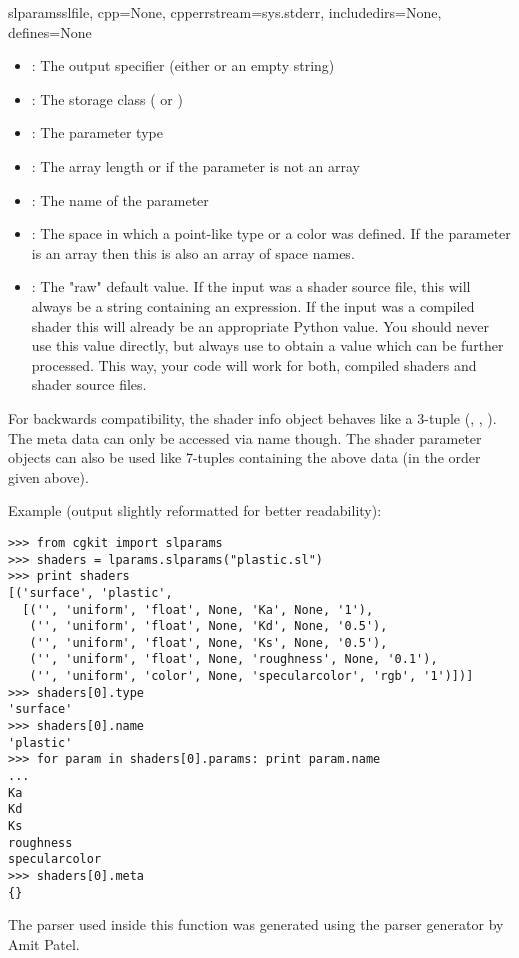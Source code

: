 \begin{funcdesc}{slparams}{slfile, cpp=None, cpperrstream=sys.stderr, includedirs=None, defines=None}
\begin{itemize}
\item {}: The output specifier (either  or an empty
string)
\item {}: The storage class ( or ) 
\item {}: The parameter type 
\item {}: The array length or  if the parameter is not
an array
\item {}: The name of the parameter 
\item {}: The space in which a point-like type or a color was
defined. If the parameter is an array then this is also an array of space names.
\item {}: The "raw" default value. If the input was a shader source file,
  this will always be a string containing an expression. If the input was
  a compiled shader this will already be an appropriate Python value.
  You should never use this value directly, but always use
   to obtain a value which can be further processed.
  This way, your code will work for both, compiled shaders and shader source files.
\end{itemize}

For backwards compatibility, the shader info object behaves like a
3-tuple (, , ). The meta data can only be
accessed via name though. The shader parameter objects can also be used
like 7-tuples containing the above data (in the order given above).

Example (output slightly reformatted for better readability):
 
\begin{verbatim}
>>> from cgkit import slparams
>>> shaders = lparams.slparams("plastic.sl")
>>> print shaders
[('surface', 'plastic', 
  [('', 'uniform', 'float', None, 'Ka', None, '1'),
   ('', 'uniform', 'float', None, 'Kd', None, '0.5'),
   ('', 'uniform', 'float', None, 'Ks', None, '0.5'),
   ('', 'uniform', 'float', None, 'roughness', None, '0.1'),
   ('', 'uniform', 'color', None, 'specularcolor', 'rgb', '1')])]
>>> shaders[0].type
'surface'
>>> shaders[0].name
'plastic'
>>> for param in shaders[0].params: print param.name
... 
Ka
Kd
Ks
roughness
specularcolor
>>> shaders[0].meta
{}
\end{verbatim}

The parser used inside this function was generated using the parser
generator  
by Amit Patel.
\end{funcdesc}

